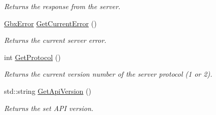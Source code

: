 \begin{DoxyCompactItemize}
\begin{DoxyCompactList}\small\item\em Returns the response from the server. \end{DoxyCompactList}\item 
\hyperlink{structGbxError}{Gbx\-Error} \hyperlink{classGbxRemote_aa3f6e467372a23c3a53510d5488bea8a}{Get\-Current\-Error} ()
\begin{DoxyCompactList}\small\item\em Returns the current server error. \end{DoxyCompactList}\item 
\hypertarget{classGbxRemote_ae6e15060920a31482fd14045cfd42803}{int \hyperlink{classGbxRemote_ae6e15060920a31482fd14045cfd42803}{Get\-Protocol} ()}\label{classGbxRemote_ae6e15060920a31482fd14045cfd42803}

\begin{DoxyCompactList}\small\item\em Returns the current version number of the server protocol (1 or 2). \end{DoxyCompactList}\item 
\hypertarget{classGbxRemote_a6351f71fe649bff2aabfbd9b7c89e3f5}{std\-::string \hyperlink{classGbxRemote_a6351f71fe649bff2aabfbd9b7c89e3f5}{Get\-Api\-Version} ()}\label{classGbxRemote_a6351f71fe649bff2aabfbd9b7c89e3f5}

\begin{DoxyCompactList}\small\item\em Returns the set A\-P\-I version. \end{DoxyCompactList}\end{DoxyCompactItemize}
